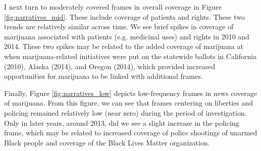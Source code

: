 





I next turn to moderately covered frames in overall coverage in Figure \ref{fig:narratives_mid}. These include coverage of patients and rights. These two trends are relatively similar across time. We see brief spikes in coverage of marijuana associated with patients (e.g. medicinal uses) and rights in 2010 and 2014. These two spikes may be related to the added coverage of marijuana at when marijuana-related initiatives were put on the statewide ballots in California (2010), Alaska (2014), and Oregon (2014), which provided increased opportunities for marijuana to be linked with additional frames.



Finally, Figure \ref{fig:narratives_low} depicts low-frequency frames in news coverage of marijuana. From this figure, we can see that frames centering on liberties and policing remained relatively low (near zero) during the period of investigation. Only in later years, around 2013, did we see a slight increase in the policing frame, which may be related to increased coverage of police shootings of unarmed Black people and coverage of the Black Lives Matter organization. 





